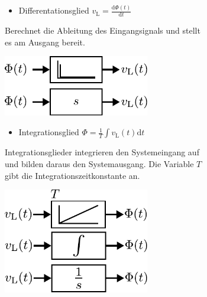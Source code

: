 \begin{figure}[h]
\begin{subfigure}[c]{\textwidth}
\begin{minipage}{0.5\textwidth}
		\begin{itemize}
			\item Differentationsglied $v_{\text{L}}=\frac{\text{d}\Phi(t)}{\text{d}t}$
		\end{itemize}
		Berechnet die Ableitung des Eingangsignals und stellt es am Ausgang bereit.
	\end{minipage}\hfill
	\begin{minipage}{0.5\textwidth}
		\centering
		\includegraphics[width=0.7\textwidth]{Abbildungen/Modellbildung/PDF/Differnzierglied.pdf}
	\end{minipage}
\end{subfigure} 
%
%
  \begin{subfigure}[c]{\textwidth}
	\begin{minipage}{0.5\textwidth}
		\begin{itemize}
			\item Integrationsglied $\Phi =\frac{1}{T}\int v_{\text{L}}(t)\text{d}t$
		\end{itemize}
	Integrationsglieder integrieren den Systemeingang auf und bilden daraus den Systemausgang. Die Variable $T$ gibt die Integrationszeitkonstante an.
	\end{minipage}\hfill
	\begin{minipage}{0.5\textwidth}
		\centering
		\includegraphics[width=0.7\textwidth]{Abbildungen/Modellbildung/PDF/Integratorglied.pdf}
	\end{minipage}

\end{subfigure}
\end{figure}
